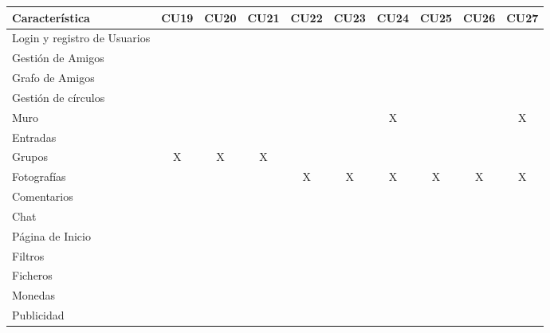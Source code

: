 \documentclass[12pt, a4paper, titlepage]{article}
\begin{document}
\begin{center}

\begin{tabular}{|p{3cm}|c|c|c|c|c|c|c|c|c|}
\hline 
\textbf{Característica} & CU19 & CU20  & CU21 & CU22 & CU23 & CU24 & CU25 & CU26 & CU27 \\ 
\hline 
Login y registro de Usuarios&   &    &   &   &   &   &   &   &   \\ 
\hline 
Gestión de Amigos &   &    &   &   &   &   &   &   &   \\ 
\hline 
Grafo de Amigos&   &    &   &   &   &   &   &   &   \\ 
\hline 
Gestión de círculos&   &    &   &   &   &   &   &   &   \\ 
\hline 
Muro&   &    &   &   &   & X  &   &   & X  \\ 
\hline 
Entradas&   &    &   &   &   &   &   &   &   \\ 
\hline 
Grupos & X   & X   & X  &   &   &   &   &   &   \\ 
\hline 
Fotografías &   &    &   &  X & X  & X  & X  & X  & X  \\ 
\hline 
Comentarios &   &    &   &   &   &   &   &   &   \\ 
\hline 
Chat&   &    &   &   &   &   &   &   &   \\ 
\hline 
Página de Inicio &   &    &   &   &   &   &   &   &   \\ 
\hline 
Filtros &   &    &   &   &   &   &   &   &   \\ 
\hline 
Ficheros &   &    &   &   &   &   &   &   &   \\  
\hline 
Monedas &   &    &   &   &   &   &   &   &   \\ 
\hline 
Publicidad &   &    &   &   &   &   &   &   &   \\ 
\hline  
\end{tabular} 
\end{center}
\end{document}

